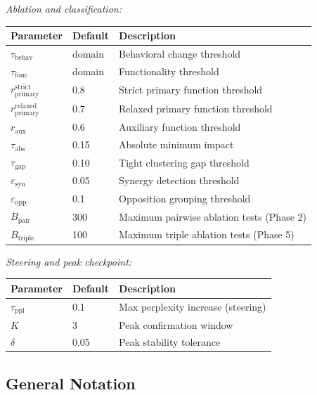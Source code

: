 \documentclass[11pt]{article}
\begin{document}
\noindent\textit{Ablation and classification:}
\begin{center}
\begin{tabular}{llp{}}
\toprule
\textbf{Parameter} & \textbf{Default} & \textbf{Description} \\
\midrule
$\tau_{\text{behav}}$ & domain & Behavioral change threshold \\
$\tau_{\text{func}}$ & domain & Functionality threshold \\
$r_{\text{primary}}^{\text{strict}}$ & 0.8 & Strict primary function threshold \\
$r_{\text{primary}}^{\text{relaxed}}$ & 0.7 & Relaxed primary function threshold \\
$r_{\text{aux}}$ & 0.6 & Auxiliary function threshold \\
$\tau_{\text{abs}}$ & 0.15 & Absolute minimum impact \\
$\tau_{\text{gap}}$ & 0.10 & Tight clustering gap threshold \\
$\varepsilon_{\text{syn}}$ & 0.05 & Synergy detection threshold \\
$\varepsilon_{\text{opp}}$ & 0.1 & Opposition grouping threshold \\
$B_{\text{pair}}$ & 300 & Maximum pairwise ablation tests (Phase 2) \\
$B_{\text{triple}}$ & 100 & Maximum triple ablation tests (Phase 5) \\
\bottomrule
\end{tabular}
\end{center}

\noindent\textit{Steering and peak checkpoint:}
\begin{center}
\begin{tabular}{llp{}}
\toprule
\textbf{Parameter} & \textbf{Default} & \textbf{Description} \\
\midrule
$\tau_{\text{ppl}}$ & 0.1 & Max perplexity increase (steering) \\
$K$ & 3 & Peak confirmation window \\
$\delta$ & 0.05 & Peak stability tolerance \\
\bottomrule
\end{tabular}
\end{center}

\subsection{General Notation}
\label{app:notation-general-notation}
\end{document}
